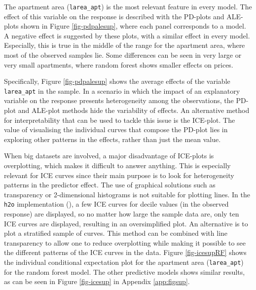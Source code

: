\documentclass[smallextended,natbib]{svjour3}\usepackage[]{graphicx}\usepackage[]{xcolor}
\newcommand{\1}[1]{\mathbbm{1}_{#1}}
\begin{document}
The apartment area (\texttt{larea\_apt}) is the most relevant feature in every model. The effect of this variable on the response is described with the PD-plots and ALE-plots shown in Figure \ref{fig-pdpalesup}, where each panel corresponds to a model. A negative effect is suggested by these plots, with a similar effect in every model. Especially, this is  true  in the middle of the range for the apartment area, where most of the observed samples lie. Some differences can be seen in very large or very small apartments, where random forest shows smaller effects on prices. 

Specifically, Figure \ref{fig-pdpalesup} shows the average effects of the variable \texttt{larea\_apt}  in the sample. In a scenario in which the impact of an explanatory variable on the response presents heterogeneity among the observations, the PD-plot and ALE-plot methods hide the variability of effects. An alternative method for interpretability that can be used to tackle this issue is the ICE-plot. The value of visualising the individual curves that compose the PD-plot lies in exploring other patterns in the effects, rather than just the mean value.  

When big datasets are involved, a major disadvantage of ICE-plots is overplotting, which makes it difficult to answer  anything. This is especially relevant for ICE curves since their main purpose is to look for heterogeneity patterns in the predictor effect. The use of graphical solutions such as transparency or 2-dimensional histograms is not suitable for plotting lines.  In the \texttt{h2o} implementation (\cite{hall2017}), a few ICE curves for decile values (in the observed response) are displayed, so no matter how large the sample data are, only ten ICE curves are displayed, resulting in an oversimplified plot. An alternative is to plot a stratified sample of curves. This method can be combined with line transparency to allow one to reduce overplotting while making it possible to see the different patterns of the ICE curves in the data. Figure \ref{fig-icesupRF} shows the individual conditional expectation plot for the apartment area (\texttt{larea\_apt}) for the  random forest model. The other predictive models shows similar results, as can be seen in Figure \ref{fig-icesup} in Appendix \ref{app:figsup}. 
\end{document}
